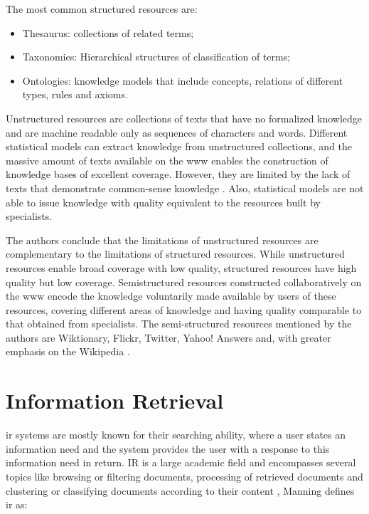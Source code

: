 The most common structured resources are:

\begin{itemize}


\item Thesaurus: collections of related terms;
\item Taxonomies: Hierarchical structures of classification of terms;
\item Ontologies: knowledge models that include concepts, relations of different types, rules and axioms.
\end{itemize}

Unstructured resources are collections of texts that have no formalized knowledge and are machine readable only as sequences of characters and words. Different statistical models can extract knowledge from unstructured collections, and the massive amount of texts available on the \gls{www} enables the construction of knowledge bases of excellent coverage. However, they are limited by the lack of texts that demonstrate common-sense knowledge \cite{hovy2013collaboratively}. Also, statistical models are not able to issue knowledge with quality equivalent to the resources built by specialists.

The authors conclude that the limitations of unstructured resources are complementary to the limitations of structured resources. While unstructured resources enable broad coverage with low quality, structured resources have high quality but low coverage. Semistructured resources constructed collaboratively on the \gls{www} encode the knowledge voluntarily made available by users of these resources, covering different areas of knowledge and having quality comparable to that obtained from specialists. The semi-structured resources mentioned by the authors are Wiktionary, Flickr, Twitter, Yahoo! Answers and, with greater emphasis on the Wikipedia \cite{hovy2013collaboratively}.




\section{\hspace{3pt}Information Retrieval}

\gls{ir} systems are mostly known for their searching ability, where a user states an information need and the system provides the user with a response to this information need in return. IR is a large academic field and encompasses several topics like browsing or filtering documents, processing of retrieved documents and clustering or classifying documents according to their content \cite{Manning:2008}, Manning defines \gls{ir} as:

